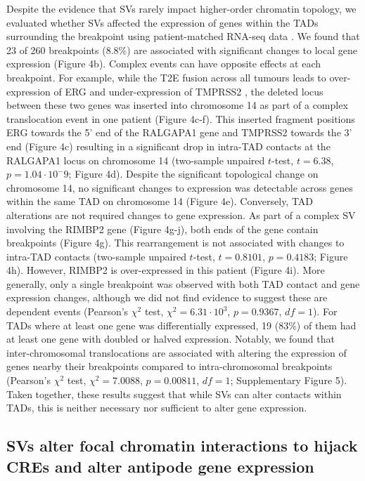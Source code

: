 Despite the evidence that SVs rarely impact higher-order chromatin topology, we evaluated whether SVs affected the expression of genes within the TADs surrounding the breakpoint using patient-matched RNA-seq data \cite{chenWidespreadFunctionalRNA2019}.
We found that 23 of 260 breakpoints (8.8\%) are associated with significant changes to local gene expression (Figure 4b).
Complex events can have opposite effects at each breakpoint.
For example, while the T2E fusion across all tumours leads to over-expression of ERG and under-expression of TMPRSS2 \cite{fraserGenomicHallmarksLocalized2017,kronTMPRSS2ERGFusion2017}, the deleted locus between these two genes was inserted into chromosome 14 as part of a complex translocation event in one patient (Figure 4c-f).
This inserted fragment positions ERG towards the 5' end of the RALGAPA1 gene and TMPRSS2 towards the 3' end (Figure 4c) resulting in a significant drop in intra-TAD contacts at the RALGAPA1 locus on chromosome 14 (two-sample unpaired $t$-test, $t = 6.38$, $p =1.04 \cdot 10^-9$; Figure 4d).
Despite the significant topological change on chromosome 14, no significant changes to expression was detectable across genes within the same TAD on chromosome 14 (Figure 4e).
Conversely, TAD alterations are not required changes to gene expression.
As part of a complex SV involving the RIMBP2 gene (Figure 4g-j), both ends of the gene contain breakpoints (Figure 4g).
This rearrangement is not associated with changes to intra-TAD contacts (two-sample unpaired $t$-test, $t = 0.8101$, $p = 0.4183$; Figure 4h).
However, RIMBP2 is over-expressed in this patient (Figure 4i).
More generally, only a single breakpoint was observed with both TAD contact and gene expression changes, although we did not find evidence to suggest these are dependent events (Pearson's $\chi^2$ test, $\chi^2 = 6.31 \cdot 10^3$, $p = 0.9367$, $df = 1$).
For TADs where at least one gene was differentially expressed, 19 (83\%) of them had at least one gene with doubled or halved expression.
Notably, we found that inter-chromosomal translocations are associated with altering the expression of genes nearby their breakpoints compared to intra-chromosomal breakpoints (Pearson's $\chi^2$ test, $\chi^2 = 7.0088$, $p = 0.00811$, $df = 1$; Supplementary Figure 5).
Taken together, these results suggest that while SVs can alter contacts within TADs, this is neither necessary nor sufficient to alter gene expression.

\subsection{SVs alter focal chromatin interactions to hijack CREs and alter antipode gene expression}

